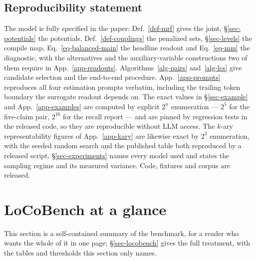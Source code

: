 \subsection*{Reproducibility statement}

The model is fully specified in the paper: Def.~\ref{def-mrf} gives the joint,
\S\ref{sec-potentials} the potentials, Def.~\ref{def-couplings} the penalized sets,
\S\ref{sec-levels} the compile map, Eq.~\ref{eq-balanced-main} the headline readout and
Eq.~\ref{eq-mm} the diagnostic, with the alternatives and the auxiliary-variable constructions two of
them require in App.~\ref{app-readouts}. Algorithms~\ref{alg-pairs} and~\ref{alg-lcs} give candidate selection and
the end-to-end procedure. App.~\ref{app-prompts} reproduces all four estimation prompts verbatim,
including the trailing token boundary the surrogate readout depends on. The exact values in
\S\ref{sec-example} and App.~\ref{app-examples} are computed by explicit $2^n$ enumeration --- $2^5$
for the five-claim pair, $2^{16}$ for the recall report --- and are pinned by regression tests in the
released code, so they are reproducible without LLM access. The $k$-ary representability figures of
App.~\ref{app-kary} are likewise exact by $2^3$ enumeration, with the seeded random search and the
published table both reproduced by a released script. \S\ref{sec-experiments} names every model used
and states the sampling regime and its measured variance. Code, fixtures and corpus are released.




\appendix

\clearpage
\section{LoCoBench at a glance}
\label{app-locobench}

This section is a self-contained summary of the benchmark, for a reader who wants the whole of it in
one page; \S\ref{sec-locobench} gives the full treatment, with the tables and thresholds this section
only names.

